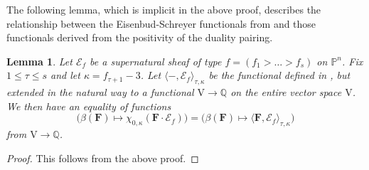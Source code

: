\documentclass[12pt]{amsart}
\newtheorem{lemma}{Lemma}[section]
\theoremstyle{definition}
\newtheorem{example}[lemma]{Example}
\theoremstyle{remark}
\newcommand{\PP}{\mathbb{P}}
\newcommand{\QQ}{\mathbb{Q}}
\newcommand{\VV}{\mathrm{V}}
\newcommand{\cE}{\mathcal{E}}
\newcommand{\FF}{\mathbf{F}}
\begin{document}
The following lemma, which is implicit in the above proof, describes the relationship between the Eisenbud-Schreyer functionals from \cites{eis-schrey1, eis-schrey-icm} and those functionals derived from the positivity of the duality pairing.
\begin{lemma}\label{lem:tau kappa}
Let $\cE_{f}$ be a supernatural sheaf of type $f=(f_1>\dots>f_s)$ on $\PP^n$.  Fix $1\leq \tau \leq s$ and let $\kappa=f_{\tau+1}-3$.  Let $\langle -, \cE_{f}\rangle_{\tau,\kappa}$ be the functional defined in \cite{eis-schrey-icm}, but extended in the natural way to a functional $\VV\to \QQ$ on the entire vector space $\VV$.  
We then have an equality of functions
\[
\bigg( \beta(\FF)\mapsto \chi_{0,\kappa}(\FF\cdot \cE_f)\bigg) =\bigg( \beta(\FF)\mapsto \langle \FF, \cE_f\rangle_{\tau,\kappa} \bigg)\]
from $\VV \to \QQ$.
\end{lemma}
\begin{proof}
This follows from the above proof.
\end{proof}
\end{document}

